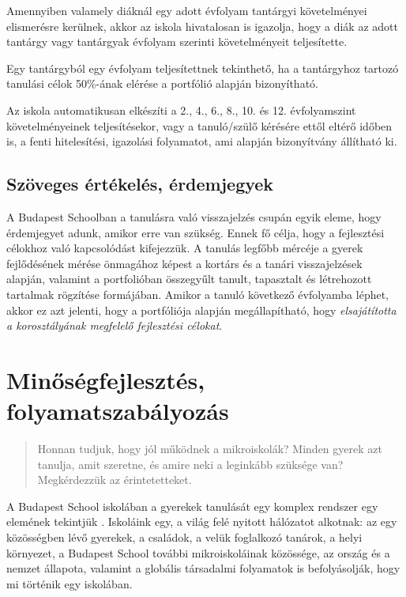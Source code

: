 Amennyiben valamely diáknál egy adott évfolyam tantárgyi követelményei elismerésre kerülnek, akkor az iskola hivatalosan is igazolja, hogy a diák az adott tantárgy vagy tantárgyak évfolyam szerinti követelményeit teljesítette.

Egy tantárgyból egy évfolyam teljesítettnek tekinthető, ha a tantárgyhoz tartozó tanulási célok 50\%-ának elérése a portfólió alapján bizonyítható.

Az iskola automatikusan elkészíti a 2., 4., 6., 8., 10. és 12. évfolyamszint követelményeinek teljesítésekor, vagy a tanuló/szülő kérésére ettől eltérő időben is, a fenti hitelesítési, igazolási folyamatot, ami alapján bizonyítvány állítható ki.

\subsection{Szöveges értékelés, érdemjegyek}

A Budapest Schoolban a tanulásra való visszajelzés csupán egyik eleme, hogy érdemjegyet adunk, amikor erre van szükség. Ennek fő célja, hogy a fejlesztési célokhoz való kapcsolódást kifejezzük. A tanulás legfőbb mércéje a gyerek fejlődésének mérése önmagához képest a kortárs és a tanári visszajelzések alapján, valamint a portfolióban összegyűlt tanult, tapasztalt és létrehozott tartalmak rögzítése formájában.  Amikor a tanuló következő évfolyamba léphet, akkor ez azt jelenti, hogy a portfóliója alapján megállapítható, hogy \emph{elsajátította a korosztályának megfelelő fejlesztési célokat}.


\section{Minőségfejlesztés, folyamatszabályozás}
\label{sec:minosegbiztositas}
\begin{quote}
Honnan tudjuk, hogy jól működnek a mikroiskolák? Minden gyerek azt tanulja, amit szeretne, és amire neki a leginkább szüksége van? Megkérdezzük az érintetetteket.
\end{quote}


A Budapest School iskolában a gyerekek tanulását egy komplex rendszer egy elemének tekintjük \citep{barabasi}. Iskoláink egy, a világ felé nyitott hálózatot alkotnak: az egy közösségben lévő gyerekek, a családok, a velük foglalkozó tanárok, a helyi környezet, a Budapest School további mikroiskoláinak közössége, az ország és a nemzet állapota, valamint a globális társadalmi folyamatok is befolyásolják, hogy mi történik egy iskolában.

